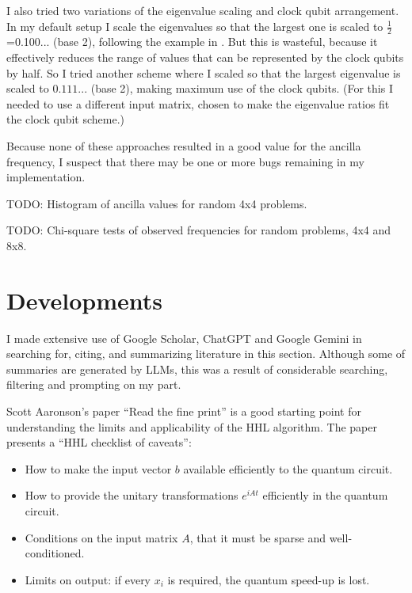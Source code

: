 \documentclass[12pt]{extarticle}
\begin{document}
I also tried two variations of the eigenvalue scaling and clock qubit arrangement.
In my default setup I scale the eigenvalues so that the largest one is scaled to $\frac{1}{2}$=0.100... (base 2), following the example in \cite{zaman2023step}.
But this is wasteful, because it effectively reduces the range of values that can be represented by the clock qubits by half.
So I tried another scheme where I scaled so that the largest eigenvalue is scaled to $0.111...$ (base 2), making maximum use of the clock qubits.
(For this I needed to use a different input matrix, chosen to make the eigenvalue ratios fit the clock qubit scheme.)

Because none of these approaches resulted in a good value for the ancilla frequency, I suspect that there may be one or more bugs remaining in my implementation.

TODO: Histogram of ancilla values for random 4x4 problems.

TODO: Chi-square tests of observed frequencies for random problems, 4x4 and 8x8.

\section{Developments}\label{sec:developments}

\begin{framed}
I made extensive use of Google Scholar, ChatGPT and Google Gemini in searching for, citing, and summarizing literature in this section.
Although some of summaries are generated by LLMs, this was a result of considerable searching, filtering and prompting on my part.
\end{framed}

Scott Aaronson's paper ``Read the fine print'' \cite{aaronson2015read} is a good starting point for understanding the limits and applicability of the HHL algorithm.
The paper presents a ``HHL checklist of caveats'':

\begin{itemize}
\item How to make the input vector $b$ available efficiently to the quantum circuit.
\item How to provide the unitary transformations $e^{iAt}$ efficiently in the quantum circuit.
\item Conditions on the input matrix $A$, that it must be sparse and well-conditioned.
\item Limits on output: if every $x_i$ is required, the quantum speed-up is lost.
\end{itemize}
\end{document}
